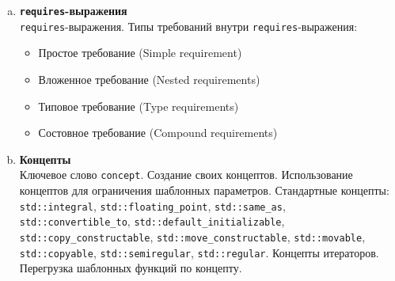 \documentclass{article}
\begin{document}
\begin{enumerate}
\begin{enumerate}[a.]
\item \textbf{\texttt{requires}-выражения}\\
\texttt{requires}-выражения. Типы требований внутри \texttt{requires}-выражения:
\begin{itemize}
\item Простое требование (Simple requirement)
\item Вложенное требование (Nested requirements)
\item Типовое требование (Type requirements)
\item Состовное требование (Compound requirements)
\end{itemize}

\item \textbf{Концепты}\\
Ключевое слово \texttt{concept}. Создание своих концептов. Использование концептов для ограничения шаблонных параметров. Стандартные концепты: 
\texttt{std::integral}, 
\texttt{std::floating\_point}, 
\texttt{std::same\_as},\\
\texttt{std::convertible\_to},
\texttt{std::default\_initializable},
\texttt{std::copy\_constructable},
\texttt{std::move\_constructable},
\texttt{std::movable},
\texttt{std::copyable},
\texttt{std::semiregular},
\texttt{std::regular}.
Концепты итераторов. Перегрузка шаблонных функций по концепту.
\end{enumerate}



\end{enumerate}














\ifx
\end{document}
